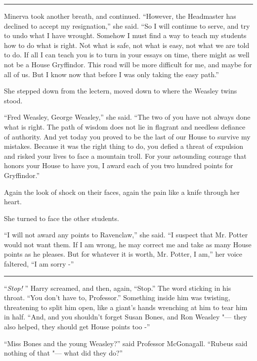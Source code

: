\begin{center}\rule{3in}{0.4pt}\end{center}

Minerva took another breath, and continued. ``However, the Headmaster
has declined to accept my resignation,'' she said. ``So I will continue
to serve, and try to undo what I have wrought. Somehow I must find a way
to teach my students how to do what is right. Not what is safe, not what
is easy, not what we are told to do. If all I can teach you is to turn
in your essays on time, there might as well not be a House Gryffindor.
This road will be more difficult for me, and maybe for all of us. But I
know now that before I was only taking the easy path.''

She stepped down from the lectern, moved down to where the Weasley twins
stood.

``Fred Weasley, George Weasley,'' she said. ``The two of you have not
always done what is right. The path of wisdom does not lie in flagrant
and needless defiance of authority. And yet today you proved to be the
last of our House to survive my mistakes. Because it was the right thing
to do, you defied a threat of expulsion and risked your lives to face a
mountain troll. For your astounding courage that honors your House to
have you, I award each of you two hundred points for Gryffindor.''

Again the look of shock on their faces, again the pain like a knife
through her heart.

She turned to face the other students.

``I will not award any points to Ravenclaw,'' she said. ``I suspect that
Mr. Potter would not want them. If I am wrong, he may correct me and
take as many House points as he pleases. But for whatever it is worth,
Mr. Potter, I am,'' her voice faltered, ``I am sorry -''

\begin{center}\rule{3in}{0.4pt}\end{center}

``\emph{Stop!} '' Harry screamed, and then, again, ``Stop.'' The word
sticking in his throat. ``You don't have to, Professor.'' Something
inside him was twisting, threatening to split him open, like a giant's
hands wrenching at him to tear him in half. ``And, and you shouldn't
forget Susan Bones, and Ron Weasley "--- they also helped, they should get
House points too -''

``Miss Bones and the young Weasley?'' said Professor McGonagall.
``Rubeus said nothing of that "--- what did they do?''

